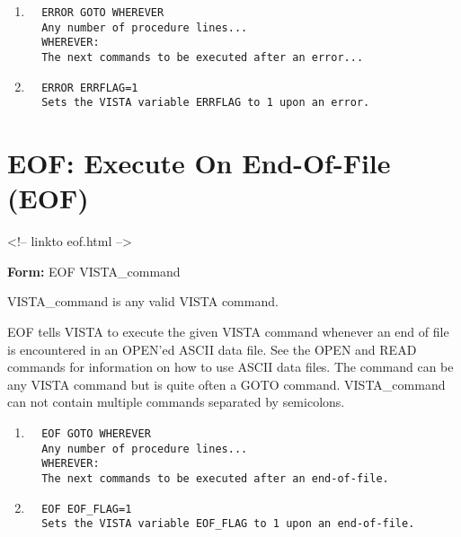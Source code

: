 \begin{enumerate}
  \item{
\begin{verbatim}
  ERROR GOTO WHEREVER
  Any number of procedure lines...
  WHEREVER:
  The next commands to be executed after an error...
\end{verbatim}
}
  \item{
\begin{verbatim}
  ERROR ERRFLAG=1
  Sets the VISTA variable ERRFLAG to 1 upon an error.
\end{verbatim}
}
\end{enumerate}

\section{EOF: Execute On End-Of-File (EOF)}
\begin{rawhtml}
<!-- linkto eof.html -->
\end{rawhtml}

\begin{command}
  \item[\textbf{Form: } EOF  VISTA\_command\hfill]{}
  \item[VISTA\_command]{is any valid VISTA command.}
\end{command}
EOF tells VISTA to execute the given VISTA command whenever an end of file
is encountered in an OPEN'ed ASCII data file. See the OPEN and READ
commands for information on how to use ASCII data files. The command can be
any VISTA command but is quite often a GOTO command.  VISTA\_command can
not contain multiple commands separated by semicolons.

\begin{enumerate}
  \item{
\begin{verbatim}
  EOF GOTO WHEREVER
  Any number of procedure lines...
  WHEREVER:
  The next commands to be executed after an end-of-file.
\end{verbatim}
}
  \item{
\begin{verbatim}
  EOF EOF_FLAG=1
  Sets the VISTA variable EOF_FLAG to 1 upon an end-of-file.
\end{verbatim}
}
\end{enumerate}

